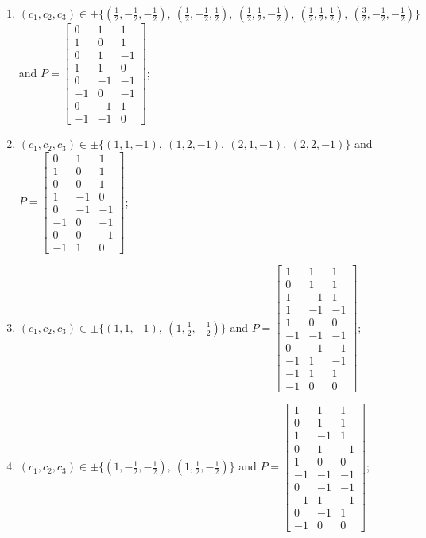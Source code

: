 \begin{enumerate}
\item[(d36)\,\newitem] $(c_1,c_2,c_3)\in \pm\{(\tfrac{1}{2},-\tfrac{1}{2},-\tfrac{1}{2}),\allowbreak\ (\tfrac{1}{2},-\tfrac{1}{2},\tfrac{1}{2}),\allowbreak\ (\tfrac{1}{2},\tfrac{1}{2},-\tfrac{1}{2}),\allowbreak\ (\tfrac{1}{2},\tfrac{1}{2},\tfrac{1}{2}),\allowbreak\ (\tfrac{3}{2},-\tfrac{1}{2},-\tfrac{1}{2})\}$ and $P=\begin{bmatrix}0&1&1\\1&0&1\\0&1&-1\\1&1&0\\0&-1&-1\\-1&0&-1\\0&-1&1\\-1&-1&0\end{bmatrix}$;
\item[(d37)] $(c_1,c_2,c_3)\in \pm\{(1,1,-1),\allowbreak\ (1,2,-1),\allowbreak\ (2,1,-1),\allowbreak\ (2,2,-1)\}$ and $P=\begin{bmatrix}0&1&1\\1&0&1\\0&0&1\\1&-1&0\\0&-1&-1\\-1&0&-1\\0&0&-1\\-1&1&0\end{bmatrix}$;
\item[(d38)\,\newitem] $(c_1,c_2,c_3)\in \pm\{(1,1,-1),\allowbreak\ (1,\tfrac{1}{2},-\tfrac{1}{2})\}$ and $P=\begin{bmatrix}1&1&1\\0&1&1\\1&-1&1\\1&-1&-1\\1&0&0\\-1&-1&-1\\0&-1&-1\\-1&1&-1\\-1&1&1\\-1&0&0\end{bmatrix}$;
\item[(d39)\,\newitem] $(c_1,c_2,c_3)\in \pm\{(1,-\tfrac{1}{2},-\tfrac{1}{2}),\allowbreak\ (1,\tfrac{1}{2},-\tfrac{1}{2})\}$ and $P=\begin{bmatrix}1&1&1\\0&1&1\\1&-1&1\\0&1&-1\\1&0&0\\-1&-1&-1\\0&-1&-1\\-1&1&-1\\0&-1&1\\-1&0&0\end{bmatrix}$;

\end{enumerate}
